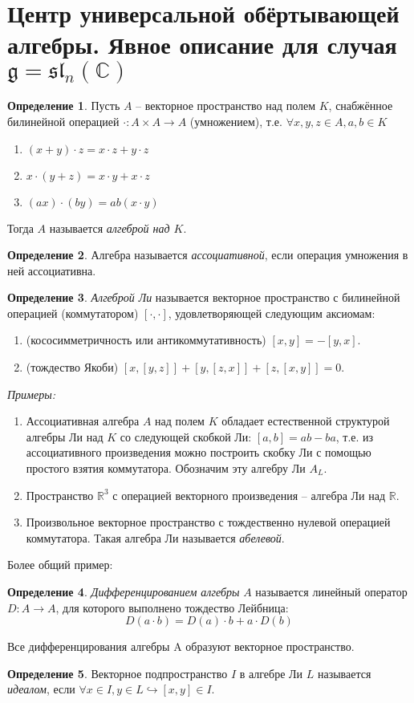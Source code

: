 \documentclass[12pt]{article}
\theoremstyle{definition}
\newtheorem{defin}{Определение}[]
\begin{document}
\section{Центр универсальной обёртывающей алгебры. Явное описание для случая $\mathfrak{g}=\mathfrak{sl}_n(\mathbb{C})$}
\begin{defin}
Пусть $A$ -- векторное пространство над полем $K$, снабжённое билинейной операцией $\cdot:A\times A\rightarrow A$ (умножением), т.е. $\forall x,y,z\in A,a,b\in K$
\begin{enumerate}
    \item $(x+y)\cdot z=x\cdot z+y\cdot z$
    \item $x\cdot(y+z)=x\cdot y+x\cdot z$
    \item $(ax)\cdot(by)=ab(x\cdot y)$
\end{enumerate}
Тогда $A$ называется \textit{алгеброй над $K$}.
\end{defin}
\begin{defin}
Алгебра называется \textit{ассоциативной}, если операция умножения в ней ассоциативна.
\end{defin}
\begin{defin}
\textit{Алгеброй Ли} называется векторное пространство с билинейной операцией (коммутатором) $[\cdot,\cdot]$, удовлетворяющей следующим аксиомам:
\begin{enumerate}
    \item (кососимметричность или антикоммутативность) $[x, y] = -[y, x]$.
    \item (тождество Якоби) $[x, [y, z]] + [y, [z, x]] + [z, [x, y]] = 0$.
\end{enumerate}
\end{defin}
\textit{Примеры:}
\begin{enumerate}
    \item Ассоциативная алгебра $A$ над полем $K$ обладает естественной структурой алгебры Ли над $K$ со следующей скобкой Ли: $[a,b] = ab - ba$, т.е. из ассоциативного произведения можно построить скобку Ли с помощью простого взятия коммутатора. Обозначим эту алгебру Ли $A_L$.
    \item Пространство $\mathbb{R}^3$ с операцией векторного произведения -- алгебра Ли над $\mathbb{R}$.
    \item Произвольное векторное пространство с тождественно нулевой операцией коммутатора. Такая алгебра Ли называется \textit{абелевой}.
\end{enumerate}
Более общий пример:
\begin{defin}
    \textit{Дифференцированием алгебры} $A$ называется линейный оператор $D:A\rightarrow A$, для которого выполнено тождество Лейбница:
    \begin{equation}
        D(a\cdot b)=D(a)\cdot b+a\cdot D(b)
    \end{equation}
\end{defin}
Все дифференцирования алгебры A образуют векторное пространство.
\begin{defin}
    Векторное подпространство $I$ в алгебре Ли $L$ называется \textit{идеалом}, если $\forall x \in I, y\in L\hookrightarrow[x,y]\in I$.
\end{defin}
\end{document}
